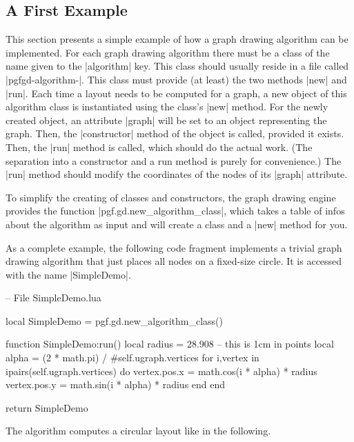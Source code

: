 \subsection{A First Example}

This section presents a simple example of how a graph drawing
algorithm can be implemented. For each graph drawing algorithm
there must be a class of the name given to the |algorithm| key. This
class should usually reside in a file called
|pgfgd-algorithm-|. This class must provide (at
least) the two methods |new| and |run|. Each time a layout needs to
be computed for a graph, a new object of this algorithm class is
instantiated using the class's |new| method. For the newly created
object, an attribute |graph| will be set to an object representing the
graph. Then, the |constructor| method of the object is called,
provided it exists. Then, the |run| method is called, which should do
the actual work. (The separation into a constructor and a run method
is purely for convenience.) The |run| method should modify the
coordinates of the nodes of its |graph| attribute.

To simplify the creating of classes and constructors, the graph
drawing engine provides the function |pgf.gd.new_algorithm_class|, which
takes a table of infos about the algorithm as input and will create a
class and a |new| method for you.

As a complete example, the following code fragment implements a
trivial graph drawing algorithm that just places all nodes on a
fixed-size circle.  It is accessed with the name 
|SimpleDemo|.


\begin{codeexample}
-- File SimpleDemo.lua

local SimpleDemo = pgf.gd.new_algorithm_class()

function SimpleDemo:run()
  local radius = 28.908  -- this is 1cm in points
  local alpha = (2 * math.pi) / #self.ugraph.vertices
  for i,vertex in ipairs(self.ugraph.vertices) do
    vertex.pos.x = math.cos(i * alpha) * radius
    vertex.pos.y = math.sin(i * alpha) * radius
  end
end

return SimpleDemo  
\end{codeexample}

The algorithm computes a circular layout like in the following.

